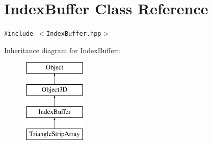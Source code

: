 \hypertarget{classm3g_1_1IndexBuffer}{
\section{IndexBuffer Class Reference}
\label{classm3g_1_1IndexBuffer}
}
{\tt \#include $<$IndexBuffer.hpp$>$}

Inheritance diagram for IndexBuffer::\begin{figure}[H]
\begin{center}
\leavevmode
\includegraphics[height=4cm]{classm3g_1_1IndexBuffer}
\end{center}
\end{figure}

